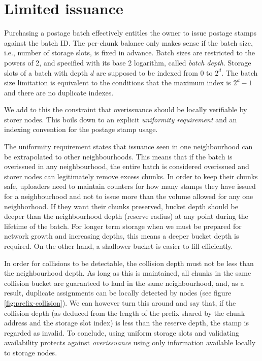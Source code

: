 \section{Limited issuance}

Purchasing a postage batch effectively entitles the owner to issue postage stamps against the batch ID. The per-chunk balance only makes sense if the batch size, i.e., number of storage slots, is fixed in advance. Batch sizes are restricted to the powers of 2, and specified with its base 2 logarithm, called \emph{batch depth}. Storage slots of a batch with depth $d$ are supposed to be indexed from 0 to $2^d$. The batch size limitation is equivalent to the conditions that the maximum index is $2^d-1$ and there are no duplicate indexes.  

We add to this the constraint that overissuance should be locally verifiable by storer nodes. This boils down to an explicit \emph{uniformity requirement} and an indexing convention for the postage stamp usage. 

The uniformity requirement states that issuance seen in one neighbourhood can be extrapolated to other neighbourhoods. This means that if the batch is overissued in any neighbourhood, the entire batch is considered overissued and storer nodes can legitimately remove excess chunks. In order to keep their chunks safe,  uploaders need to maintain counters for how many stamps they have issued for a neighbourhood and not to issue more than the volume allowed for any one neighborhood.
If they want their chunks preserved, bucket depth should be deeper than the neighbourhood depth (reserve radius) at any point during the lifetime of the batch. For longer term storage when we must be prepared for network growth and increasing depths, this means a deeper bucket depth is required. On the other hand, a shallower bucket is easier to fill efficiently.


 


In order for collisions to be detectable, the collision depth must not be less  than the  neighbourhood depth.
As long as this is maintained, all chunks in the same collision bucket are guaranteed to land in the same neighbourhood, and, as a result, duplicate assignments can be locally detected by nodes (see figure \ref{fig:prefix-collision}).
We can however turn this around and say that, if the collision depth (as deduced from the length of the prefix shared by the chunk address and the storage slot index) is less than the reserve depth, the stamp is regarded as invalid.
To conclude, using uniform storage slots and validating availability protects against \emph{overissuance} using only information available locally to storage nodes. 




